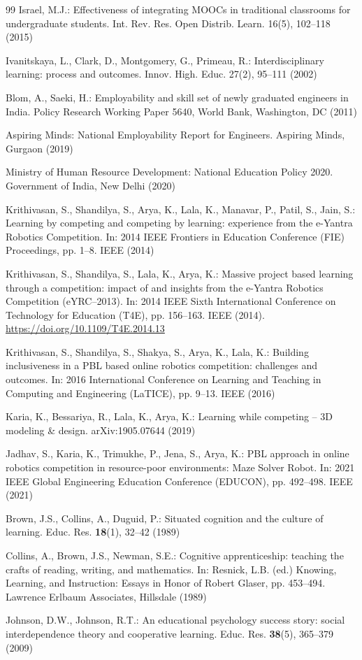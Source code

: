\documentclass[runningheads]{llncs}
\begin{document}
\begin{thebibliography}{99}
Israel, M.J.: Effectiveness of integrating MOOCs in traditional classrooms for undergraduate students. Int. Rev. Res. Open Distrib. Learn. 16(5), 102–118 (2015)

Ivanitskaya, L., Clark, D., Montgomery, G., Primeau, R.: Interdisciplinary learning: process and outcomes. Innov. High. Educ. 27(2), 95–111 (2002)

Blom, A., Saeki, H.: Employability and skill set of newly graduated engineers in India. Policy Research Working Paper 5640, World Bank, Washington, DC (2011)

Aspiring Minds: National Employability Report for Engineers. Aspiring Minds, Gurgaon (2019)

Ministry of Human Resource Development: National Education Policy 2020. Government of India, New Delhi (2020)

Krithivasan, S., Shandilya, S., Arya, K., Lala, K., Manavar, P., Patil, S., Jain, S.: Learning by competing and competing by learning: experience from the e-Yantra Robotics Competition. In: 2014 IEEE Frontiers in Education Conference (FIE) Proceedings, pp. 1–8. IEEE (2014)

Krithivasan, S., Shandilya, S., Lala, K., Arya, K.: Massive project based learning through a competition: impact of and insights from the e-Yantra Robotics Competition (eYRC–2013). In: 2014 IEEE Sixth International Conference on Technology for Education (T4E), pp. 156–163. IEEE (2014). \url{https://doi.org/10.1109/T4E.2014.13}

Krithivasan, S., Shandilya, S., Shakya, S., Arya, K., Lala, K.: Building inclusiveness in a PBL based online robotics competition: challenges and outcomes. In: 2016 International Conference on Learning and Teaching in Computing and Engineering (LaTICE), pp. 9–13. IEEE (2016)

Karia, K., Bessariya, R., Lala, K., Arya, K.: Learning while competing – 3D modeling \& design. arXiv:1905.07644 (2019)

Jadhav, S., Karia, K., Trimukhe, P., Jena, S., Arya, K.: PBL approach in online robotics competition in resource-poor environments: Maze Solver Robot. In: 2021 IEEE Global Engineering Education Conference (EDUCON), pp. 492–498. IEEE (2021)

Brown, J.S., Collins, A., Duguid, P.: Situated cognition and the culture of learning. Educ. Res. \textbf{18}(1), 32–42 (1989)

Collins, A., Brown, J.S., Newman, S.E.: Cognitive apprenticeship: teaching the crafts of reading, writing, and mathematics. In: Resnick, L.B. (ed.) Knowing, Learning, and Instruction: Essays in Honor of Robert Glaser, pp. 453–494. Lawrence Erlbaum Associates, Hillsdale (1989)

Johnson, D.W., Johnson, R.T.: An educational psychology success story: social interdependence theory and cooperative learning. Educ. Res. \textbf{38}(5), 365–379 (2009)

\end{thebibliography}
\end{document}
